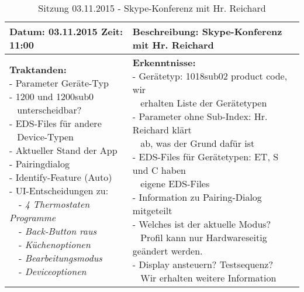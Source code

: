 \begin{table}[H]
\begin{tabularx}{\textwidth}{| l | X |}
\hline
\textbf{Datum:} 03.11.2015
\textbf{Zeit:} 11:00
&
\textbf{Beschreibung:} Skype-Konferenz mit Hr. Reichard \\ \hline
\specialcell[t]{
\textbf{Traktanden:}\\
- Parameter Geräte-Typ\\
- 1200 und 1200sub0\\~ unterscheidbar?\\
- EDS-Files für andere\\~ Device-Typen\\
- Aktueller Stand der App\\
- Pairingdialog\\
- Identify-Feature (Auto)\\
- UI-Entscheidungen zu:\\
~~- \textit{4 Thermostaten Programme}\\
~~- \textit{Back-Button raus}\\
~~- \textit{Küchenoptionen}\\
~~- \textit{Bearbeitungsmodus}\\
~~- \textit{Deviceoptionen}\\
}
& 
\specialcell[t]{
\textbf{Erkenntnisse:}\\
- Gerätetyp: 1018sub02 product code, wir\\~ erhalten Liste der Gerätetypen\\
- Parameter ohne Sub-Index: Hr. Reichard klärt\\~ ab, was der Grund dafür ist\\
- EDS-Files für Gerätetypen: ET, S und C haben\\~ eigene EDS-Files\\
- Information zu Pairing-Dialog mitgeteilt\\
- Welches ist der aktuelle Modus?\\~ Profil kann nur Hardwareseitig geändert werden.\\
- Display ansteuern? Testsequenz?\\~ Wir erhalten weitere Information\\
}
\\ \hline
\end{tabularx}
\caption{Sitzung 03.11.2015 - Skype-Konferenz mit Hr. Reichard}
\end{table}




